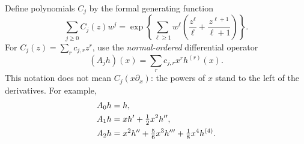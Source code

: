 Define polynomials $C_j$ by the formal generating function
\begin{equation}\label{zeros:eq:Cgen}
 \sum_{j\geq0}C_j(z)w^j
   =\exp\left\{\sum_{\ell\geq1}w^\ell
       \left(\frac{z^\ell}{\ell}+\frac{z^{\ell+1}}{\ell+1}\right)\right\}.
\end{equation}
For $C_j(z)=\sum_r c_{j,r}z^r$, use the \emph{normal-ordered} differential operator
\begin{equation}\label{zeros:eq:Aj}
 (A_jh)(x)=\sum_r c_{j,r}x^r h^{(r)}(x).
\end{equation}
This notation does not mean $C_j(x\partial_x)$: the powers of $x$ stand to the left of the derivatives. For example,
\begin{align}
 A_0h&=h,\notag\\
 A_1h&=xh'+\tfrac12x^2h'',\label{zeros:eq:Afirst}\\
 A_2h&=x^2h''+\tfrac56x^3h'''+\tfrac18x^4h^{(4)}.\notag
\end{align}

